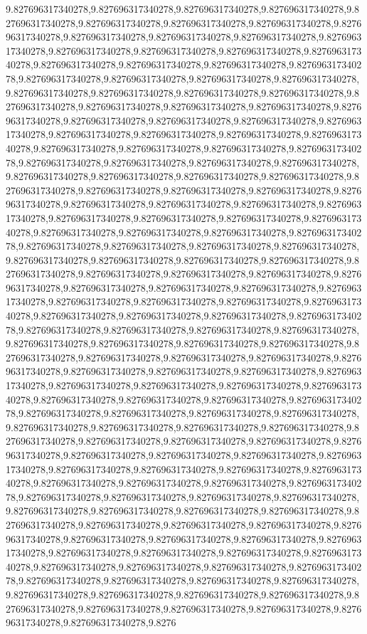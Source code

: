9.827696317340278,9.827696317340278,9.827696317340278,9.827696317340278,9.827696317340278,9.827696317340278,9.827696317340278,9.827696317340278,9.827696317340278,9.827696317340278,9.827696317340278,9.827696317340278,9.827696317340278,9.827696317340278,9.827696317340278,9.827696317340278,9.827696317340278,9.827696317340278,9.827696317340278,9.827696317340278,9.827696317340278,9.827696317340278,9.827696317340278,9.827696317340278,9.827696317340278,9.827696317340278,9.827696317340278,9.827696317340278,9.827696317340278,9.827696317340278,9.827696317340278,9.827696317340278,9.827696317340278,9.827696317340278,9.827696317340278,9.827696317340278,9.827696317340278,9.827696317340278,9.827696317340278,9.827696317340278,9.827696317340278,9.827696317340278,9.827696317340278,9.827696317340278,9.827696317340278,9.827696317340278,9.827696317340278,9.827696317340278,9.827696317340278,9.827696317340278,9.827696317340278,9.827696317340278,9.827696317340278,9.827696317340278,9.827696317340278,9.827696317340278,9.827696317340278,9.827696317340278,9.827696317340278,9.827696317340278,9.827696317340278,9.827696317340278,9.827696317340278,9.827696317340278,9.827696317340278,9.827696317340278,9.827696317340278,9.827696317340278,9.827696317340278,9.827696317340278,9.827696317340278,9.827696317340278,9.827696317340278,9.827696317340278,9.827696317340278,9.827696317340278,9.827696317340278,9.827696317340278,9.827696317340278,9.827696317340278,9.827696317340278,9.827696317340278,9.827696317340278,9.827696317340278,9.827696317340278,9.827696317340278,9.827696317340278,9.827696317340278,9.827696317340278,9.827696317340278,9.827696317340278,9.827696317340278,9.827696317340278,9.827696317340278,9.827696317340278,9.827696317340278,9.827696317340278,9.827696317340278,9.827696317340278,9.827696317340278,9.827696317340278,9.827696317340278,9.827696317340278,9.827696317340278,9.827696317340278,9.827696317340278,9.827696317340278,9.827696317340278,9.827696317340278,9.827696317340278,9.827696317340278,9.827696317340278,9.827696317340278,9.827696317340278,9.827696317340278,9.827696317340278,9.827696317340278,9.827696317340278,9.827696317340278,9.827696317340278,9.827696317340278,9.827696317340278,9.827696317340278,9.827696317340278,9.827696317340278,9.827696317340278,9.827696317340278,9.827696317340278,9.827696317340278,9.827696317340278,9.827696317340278,9.827696317340278,9.827696317340278,9.827696317340278,9.827696317340278,9.827696317340278,9.827696317340278,9.827696317340278,9.827696317340278,9.827696317340278,9.827696317340278,9.827696317340278,9.827696317340278,9.827696317340278,9.827696317340278,9.827696317340278,9.827696317340278,9.827696317340278,9.827696317340278,9.827696317340278,9.827696317340278,9.827696317340278,9.827696317340278,9.827696317340278,9.827696317340278,9.827696317340278,9.827696317340278,9.827696317340278,9.827696317340278,9.827696317340278,9.827696317340278,9.827696317340278,9.827696317340278,9.827696317340278,9.827696317340278,9.827696317340278,9.827696317340278,9.827696317340278,9.827696317340278,9.827696317340278,9.827696317340278,9.827696317340278,9.827696317340278,9.827696317340278,9.827696317340278,9.827696317340278,9.827696317340278,9.827696317340278,9.827696317340278,9.827696317340278,9.827696317340278,9.827696317340278,9.827696317340278,9.827696317340278,9.827696317340278,9.8276